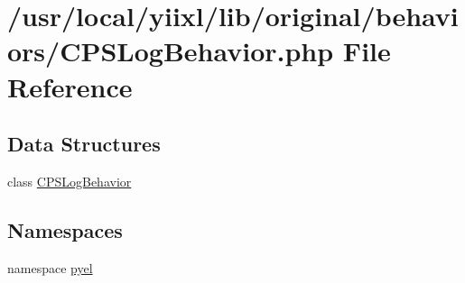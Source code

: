 \hypertarget{CPSLogBehavior_8php}{
\section{/usr/local/yiixl/lib/original/behaviors/CPSLogBehavior.php File Reference}
\label{CPSLogBehavior_8php}
}
\subsection*{Data Structures}
\begin{DoxyCompactItemize}
\item 
class \hyperlink{classCPSLogBehavior}{CPSLogBehavior}
\end{DoxyCompactItemize}
\subsection*{Namespaces}
\begin{DoxyCompactItemize}
\item 
namespace \hyperlink{namespacepyel}{pyel}
\end{DoxyCompactItemize}
